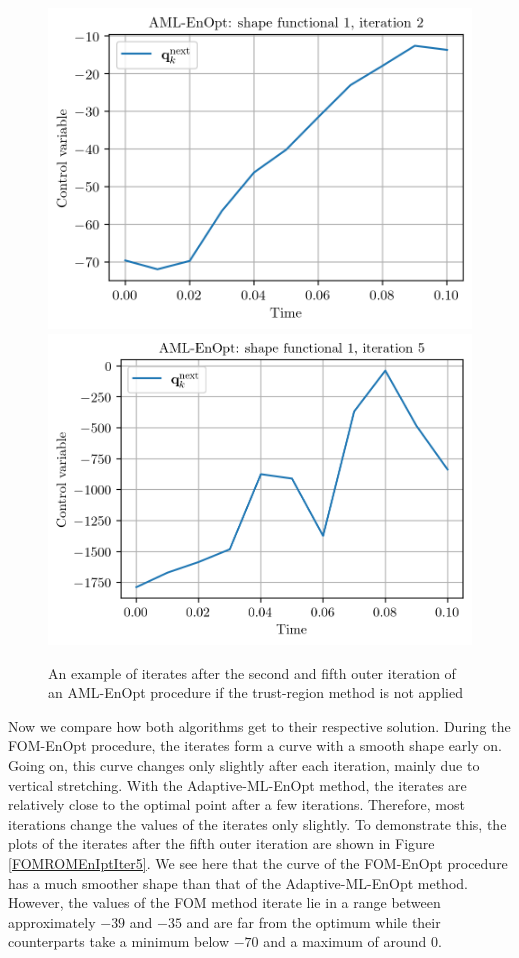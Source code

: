 \begin{figure}
\centering
\includegraphics{Plots/noTRIteration2.png}
\includegraphics{Plots/noTRIteration5.png}
\caption{\label{noTRResults}An example of iterates after the second and fifth outer iteration of an AML-EnOpt procedure if the trust-region method is not applied}
\end{figure}

Now we compare how both algorithms get to their respective solution. During the FOM-EnOpt procedure, the iterates form a curve with a smooth shape early on. Going on, this curve changes only slightly after each iteration, mainly due to vertical stretching. With the Adaptive-ML-EnOpt method, the iterates are relatively close to the optimal point after a few iterations. Therefore, most iterations change the values of the iterates only slightly. To demonstrate this, the plots of the iterates after the fifth outer iteration are shown in Figure \ref{FOMROMEnIptIter5}. We see here that the curve of the FOM-EnOpt procedure has a much smoother shape than that of the Adaptive-ML-EnOpt method. However, the values of the FOM method iterate lie in a range between approximately $-39$ and $-35$ and are far from the optimum while their counterparts take a minimum below $-70$ and a maximum of around $0$.\\

